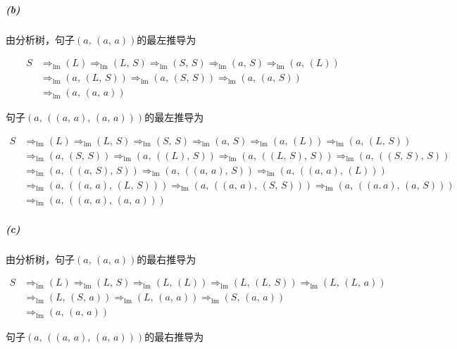 \documentclass{article}
\begin{document}
\subparagraph{(b)}
由分析树，句子$(a,\,(a,\,a))$的最左推导为

\begin{align*}
    S &\Rightarrow_{\text{lm}} (L) \Rightarrow_{\text{lm}} (L,\,S) \Rightarrow_{\text{lm}} (S,\,S) \Rightarrow_{\text{lm}} (a,\,S) \Rightarrow_{\text{lm}} (a,\,(L)) \\ 
    &\Rightarrow_{\text{lm}} (a,\,(L,\,S))
    \Rightarrow_{\text{lm}} (a,\,(S,\,S)) \Rightarrow_{\text{lm}} (a,\,(a,\,S)) \\
    &\Rightarrow_{\text{lm}} (a,\,(a,\,a))
\end{align*}

句子$(a,\,((a,\,a),\,(a,\,a)))$的最左推导为

\begin{align*}
    S &\Rightarrow_{\text{lm}} (L) \Rightarrow_{\text{lm}} (L,\,S) \Rightarrow_{\text{lm}} (S,\,S) \Rightarrow_{\text{lm}} (a,\,S) \Rightarrow_{\text{lm}} (a,\,(L)) \Rightarrow_{\text{lm}} (a,\,(L,\,S)) \\
    &\Rightarrow_{\text{lm}} (a,\,(S,\,S)) \Rightarrow_{\text{lm}} (a,\,((L),\,S)) \Rightarrow_{\text{lm}} (a,\,((L,\,S),\,S)) \Rightarrow_{\text{lm}} (a,\,((S,\,S),\,S)) \\
    &\Rightarrow_{\text{lm}} (a,\,((a,\,S),\,S))
    \Rightarrow_{\text{lm}} (a,\,((a,\,a),\,S)) \Rightarrow_{\text{lm}} (a,\,((a,\,a),\,(L))) \\
    &\Rightarrow_{\text{lm}} (a,\,((a,\,a),\,(L,\,S)))
    \Rightarrow_{\text{lm}} (a,\,((a,\,a),\,(S,\,S))) \Rightarrow_{\text{lm}} (a,\,((a.\,a),\,(a,\,S))) \\
    &\Rightarrow_{\text{lm}} (a,\,((a,\,a),\,(a,\,a)))
\end{align*}

\subparagraph{(c)}
由分析树，句子$(a,\,(a,\,a))$的最右推导为

\begin{align*}
    S &\Rightarrow_{\text{lm}} (L) \Rightarrow_{\text{lm}} (L,\,S) \Rightarrow_{\text{lm}} (L,\,(L)) \Rightarrow_{\text{lm}} (L,\,(L,\,S)) \Rightarrow_{\text{lm}} (L,\,(L,\,a)) \\ 
    &\Rightarrow_{\text{lm}} (L,\,(S,\,a))
    \Rightarrow_{\text{lm}} (L,\,(a,\,a)) \Rightarrow_{\text{lm}} (S,\,(a,\,a)) \\
    &\Rightarrow_{\text{lm}} (a,\,(a,\,a))
\end{align*}

句子$(a,\,((a,\,a),\,(a,\,a)))$的最右推导为
\end{document}
